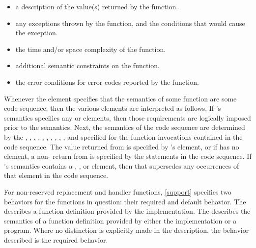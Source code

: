 \begin{itemize}
\item
\returns
a description of the value(s) returned by the function.

\item
\throws
any exceptions thrown by the function, and the conditions that would cause the exception.

\item
\complexity
the time and/or space complexity of the function.

\item
\remarks
additional semantic constraints on the function.

\item
\errors
the error conditions for error codes reported by the function.
\end{itemize}

\pnum
Whenever the  element specifies that the semantics of some function
 are  some code sequence, then the various elements are
interpreted as follows.
If 's semantics specifies any  or  elements,
then those requirements are logically imposed prior to the  semantics.
Next, the semantics of the code sequence are determined by the
, , , ,
, , , ,
, , and 
specified for the function invocations contained in the code sequence.
The value returned from  is specified by 's  element,
or if  has no  element,
a non- return from  is specified by the
 statements in the code sequence.
If 's semantics contains a ,
, or  element,
then that supersedes any occurrences of that element in the code sequence.

\pnum
For non-reserved replacement and handler functions,
\ref{support} specifies two behaviors for the functions in question:
their required and default behavior.
The 
describes a function definition provided by the implementation.
The 
describes the semantics of a function definition provided by
either the implementation or a \Cpp{} program.
Where no distinction is explicitly made in the description, the
behavior described is the required behavior.

